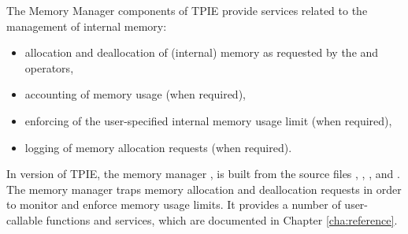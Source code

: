 The Memory Manager components of TPIE provide services related to
the management of internal memory:
\begin{itemize}
\item allocation and deallocation of (internal)
memory as requested by the  and  operators,
\item accounting of memory usage (when required),
\item enforcing of the user-specified internal memory usage
limit (when required),
\item logging of memory allocation requests (when required).
\end{itemize}

In version \version of TPIE, the memory manager
, is built from the source files
, ,
, and .  The memory
manager traps memory allocation and deallocation requests in
order to monitor and enforce memory usage limits. It
provides a number of user-callable functions and services,
which are documented in Chapter \ref{cha:reference}.

\tobewritten




